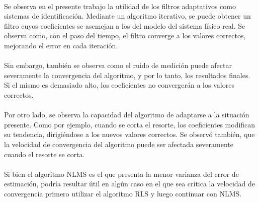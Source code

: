 \paragraph{}
Se observa en el presente trabajo la utilidad de los filtros adaptativos como sistemas de identificación. Mediante un algoritmo iterativo, se puede obtener un filtro cuyos coeficientes se asemejan a los del modelo del sistema físico real. Se observa como, con el paso del tiempo, el filtro converge a los valores correctos, mejorando el error en cada iteración.
\paragraph{}
Sin embargo, también se observa como el ruido de medición puede afectar severamente la convergencia del algoritmo, y por lo tanto, los resultados finales. Si el mismo es demasiado alto, los coeficientes no convergerán a los valores correctos.
\paragraph{}
Por otro lado, se observa la capacidad del algoritmo de adaptarse a la situación presente. Como por ejemplo, cuando se corta el resorte, los coeficientes modifican su tendencia, dirigiéndose a los nuevos valores correctos. Se observó también, que la velocidad de convergencia del algoritmo puede ser afectada severamente cuando el resorte se corta.
\paragraph{}
Si bien el algoritmo NLMS es el que presenta la menor varianza del error de estimación, podría resultar útil en algún caso en el que sea crítica la velocidad de convergencia primero utilizar el algoritmo RLS y luego continuar con NLMS.

